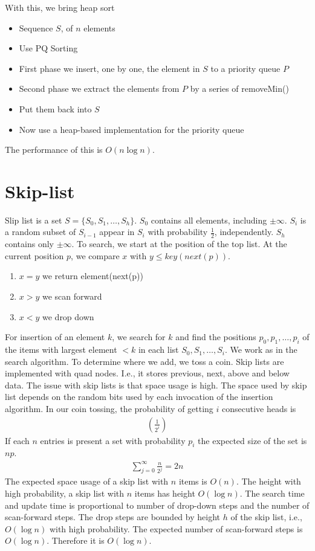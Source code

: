 \documentclass[a4paper]{article}
\theoremstyle{plain}
\theoremstyle{definition}
\theoremstyle{remark}
\begin{document}
With this, we bring heap sort
\begin{itemize}
	\item Sequence $S$, of $n$ elements
	\item Use PQ Sorting
	\item First phase we insert, one by one, the element in  $S$ to a priority queue $P$ 
	\item Second phase we extract the elements from $P$ by a series of removeMin()
	\item Put them back into $S$ 
	\item Now use a heap-based implementation for the priority queue
\end{itemize}
The performance of this is $O(n \log n)$.
\section{Skip-list}
Slip list is a set $S = \{ S_0,S_1,\ldots,S_h\}$. $S_0$ contains all elements, including $\pm \infty$. $S_i$ is a random subset of $S_{i-1}$ appear in $S_i$ with probability $\frac{1}{2}$, independently. $S_h$ contains only $\pm \infty$. To search, we start at the position of the top list. At the current position $p$, we compare $x$ with $y \le  key(next(p))$.
\begin{enumerate}
	\item $x=y$ we return element(next(p))
	\item $x>y$ we scan forward
	\item $x<y$ we drop down
\end{enumerate}
For insertion of an element $k$, we search for $k$ and find the positions $p_0,p_1,\ldots,p_i$ of the items with largest element $<k$ in each list $S_0,S_1,\ldots,S_i$. We work as in the search algorithm. To determine where we add, we toss a coin. Skip lists are implemented with quad nodes. I.e., it stores previous, next, above and below data. The issue with skip lists is that space usage is high. The space used by skip list depends on the random bits used by each invocation of the insertion algorithm. In our coin tossing, the probability of getting  $i$ consecutive heads is
\begin{align*}
	\left( \frac{1}{2^{i}} \right) 
\end{align*}
If each $n $ entries is present a set with probability $p_i$ the expected size of the set is $np$. 
\begin{align*}
	\sum_{j=0}^{\infty} \frac{n}{2^{j}} = 2n
\end{align*}
The expected space usage of a skip list with $n$ items is $O(n)$. The height with high probability, a skip list with $n$ items has height $O(\log n)$. The search time and update time is proportional to number of drop-down steps and the number of scan-forward steps. The drop steps are bounded by height $h$ of the skip list, i.e., $O(\log n)$ with high probability. The expected number of scan-forward steps is $O(\log n)$. Therefore it is $O( \log n)$.
\end{document}
